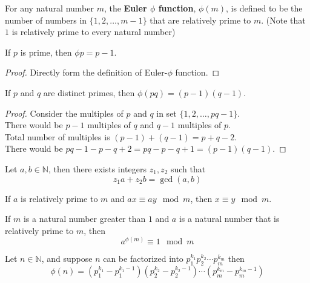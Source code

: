 \documentclass[11pt]{article}
\begin{document}
		\begin{definition}[7.2.12]
			For any natural number $m$, the \textbf{Euler $\phi$ function}, $\phi(m)$, is defined to be the number of numbers in $\{1,2,\dots,m-1\}$ that are relatively prime to $m$. (Note that $1$ is relatively prime to every natural number)
		\end{definition}
		
		\begin{theorem}[7.2.14]
			If $p$ is prime, then $\phi{p} = p-1$.
		\end{theorem}
		\begin{proof}
			Directly form the definition of Euler-$\phi$ function.
		\end{proof}
		
		\begin{theorem}[7.2.15]
			If $p$ and $q$ are distinct primes, then $\phi(pq) = (p-1)(q-1)$.
		\end{theorem}
		\begin{proof}
			Consider the multiples of $p$ and $q$ in set $\{1, 2, \dots, pq - 1\}$. \\
			There would be $p-1$ multiples of $q$ and $q-1$ multiples of $p$. \\
			Total number of multiples is $(p-1) + (q-1) = p+q-2$. \\
			There would be $pq - 1 - p - q + 2 = pq - p - q + 1= (p-1)(q-1)$.  
		\end{proof}
		
		\begin{theorem}
			Let $a, b \in \mathbb{N}$, then there exists integers $z_1,z_2$ such that
			\[
				z_1 a + z_2 b = \gcd(a,b)
			\]
		\end{theorem}
		
		\begin{theorem}
			If $a$ is relatively prime to $m$ and $ax \equiv ay \mod m$, then $x \equiv y \mod m$.
		\end{theorem}
		
		\begin{theorem}
			If $m$ is a natural number greater than $1$ and $a$ is a natural number that is relatively prime to $m$, then 
			\[
				a^{\phi(m)} \equiv 1 \mod m
			\]
		\end{theorem}
		
		\begin{theorem}[7.3.Q27]
			Let $n \in \mathbb{N}$, and suppose $n$ can be factorized into $p_1^{k_1} p_2^{k_2} \cdots p_m^{k_m}$ then
			\[
				\phi(n) = (p_1^{k_1} - p_1^{k_1 - 1})(p_2^{k_2} - p_2^{k_2 - 1}) \cdots (p_m^{k_m} - p_m^{k_m - 1})
			\]
		\end{theorem}
	
\end{document}
